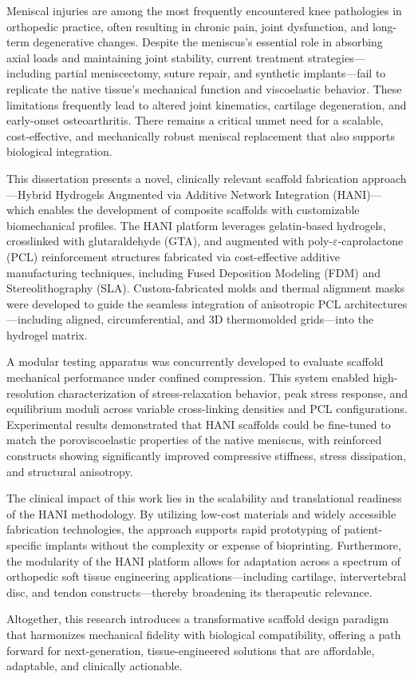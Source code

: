 \dissabstract

Meniscal injuries are among the most frequently encountered knee pathologies in orthopedic practice, often resulting in chronic pain, joint dysfunction, and long-term degenerative changes. Despite the meniscus's essential role in absorbing axial loads and maintaining joint stability, current treatment strategies—including partial meniscectomy, suture repair, and synthetic implants—fail to replicate the native tissue's mechanical function and viscoelastic behavior. These limitations frequently lead to altered joint kinematics, cartilage degeneration, and early-onset osteoarthritis. There remains a critical unmet need for a scalable, cost-effective, and mechanically robust meniscal replacement that also supports biological integration.

This dissertation presents a novel, clinically relevant scaffold fabrication approach—Hybrid Hydrogels Augmented via Additive Network Integration (HANI)—which enables the development of composite scaffolds with customizable biomechanical profiles. The HANI platform leverages gelatin-based hydrogels, crosslinked with glutaraldehyde (GTA), and augmented with poly-$\varepsilon$-caprolactone (PCL) reinforcement structures fabricated via cost-effective additive manufacturing techniques, including Fused Deposition Modeling (FDM) and Stereolithography (SLA). Custom-fabricated molds and thermal alignment masks were developed to guide the seamless integration of anisotropic PCL architectures—including aligned, circumferential, and 3D thermomolded grids—into the hydrogel matrix.

A modular testing apparatus was concurrently developed to evaluate scaffold mechanical performance under confined compression. This system enabled high-resolution characterization of stress-relaxation behavior, peak stress response, and equilibrium moduli across variable cross-linking densities and PCL configurations. Experimental results demonstrated that HANI scaffolds could be fine-tuned to match the poroviscoelastic properties of the native meniscus, with reinforced constructs showing significantly improved compressive stiffness, stress dissipation, and structural anisotropy.

The clinical impact of this work lies in the scalability and translational readiness of the HANI methodology. By utilizing low-cost materials and widely accessible fabrication technologies, the approach supports rapid prototyping of patient-specific implants without the complexity or expense of bioprinting. Furthermore, the modularity of the HANI platform allows for adaptation across a spectrum of orthopedic soft tissue engineering applications—including cartilage, intervertebral disc, and tendon constructs—thereby broadening its therapeutic relevance.

Altogether, this research introduces a transformative scaffold design paradigm that harmonizes mechanical fidelity with biological compatibility, offering a path forward for next-generation, tissue-engineered solutions that are affordable, adaptable, and clinically actionable.
    
    